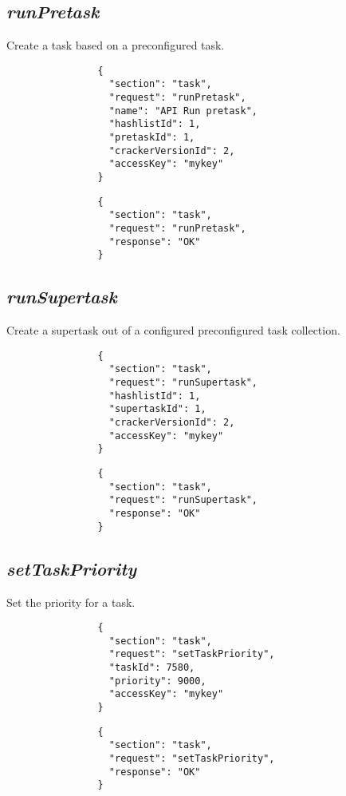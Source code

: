 		\subsection*{\textit{runPretask}}
			Create a task based on a preconfigured task.
			{
				\color{blue}
				\begin{verbatim}
				{
				  "section": "task",
				  "request": "runPretask",
				  "name": "API Run pretask",
				  "hashlistId": 1,
				  "pretaskId": 1,
				  "crackerVersionId": 2,
				  "accessKey": "mykey"
				}
				\end{verbatim}
			}
			{
				\color{OliveGreen}
				\begin{verbatim}
				{
				  "section": "task",
				  "request": "runPretask",
				  "response": "OK"
				}
				\end{verbatim}
			}		
		\subsection*{\textit{runSupertask}}
			Create a supertask out of a configured preconfigured task collection.
			{
				\color{blue}
				\begin{verbatim}
				{
				  "section": "task",
				  "request": "runSupertask",
				  "hashlistId": 1,
				  "supertaskId": 1,
				  "crackerVersionId": 2,
				  "accessKey": "mykey"
				}
				\end{verbatim}
			}
			{
				\color{OliveGreen}
				\begin{verbatim}
				{
				  "section": "task",
				  "request": "runSupertask",
				  "response": "OK"
				}
				\end{verbatim}
			}	
		\subsection*{\textit{setTaskPriority}}
			Set the priority for a task.
			{
				\color{blue}
				\begin{verbatim}
				{
				  "section": "task",
				  "request": "setTaskPriority",
				  "taskId": 7580,
				  "priority": 9000,
				  "accessKey": "mykey"
				}
				\end{verbatim}
			}
			{
				\color{OliveGreen}
				\begin{verbatim}
				{
				  "section": "task",
				  "request": "setTaskPriority",
				  "response": "OK"
				}
				\end{verbatim}
			}		
